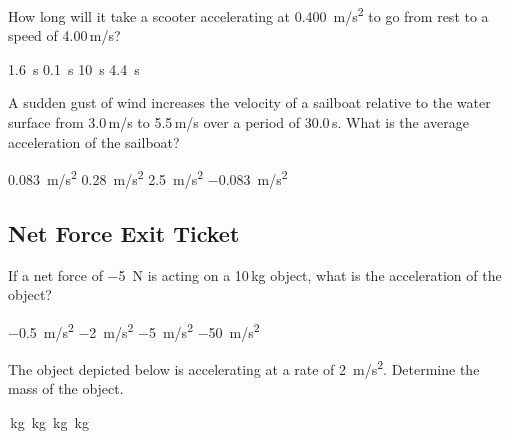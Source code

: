 \documentclass[../main-physics-problems.tex]{subfiles}
\begin{document}
\begin{questions}
\question
How long will it take a scooter accelerating at \SI{0.400}{m/s^2} to go from rest to a speed of 4.00\,m/s?

\begin{randomizechoices}
    \choice \SI{1.6}{s}
    \choice \SI{0.1}{s}
    \correctchoice \SI{10}{s}
    \choice \SI{4.4}{s}
\end{randomizechoices}

\question
A sudden gust of wind increases the velocity of a sailboat relative to the water surface from 3.0\,m/s to 5.5\,m/s over a period of 30.0\,s. What is the average acceleration of the sailboat?

\begin{randomizechoices}
    \correctchoice \SI{0.083}{m/s^2}
    \choice \SI{0.28}{m/s^2}
    \choice \SI{2.5}{m/s^2}
    \choice \SI{-0.083}{m/s^2}
\end{randomizechoices}

\begin{EnvUplevel}
    \subsection*{Net Force Exit Ticket}
\end{EnvUplevel}

\question
If a net force of \SI{-5}{N} is acting on a 10\,kg object, what is the acceleration of the object?

\begin{randomizechoices}
    \correctchoice \SI{-0.5}{m/s^2}
    \choice \SI{-2}{m/s^2}
    \choice \SI{-5}{m/s^2}
    \choice \SI{-50}{m/s^2}
\end{randomizechoices}

\question
The object depicted below is accelerating at a rate of \SI{2}{m/s^2}. Determine the mass of the object.

\begin{center}
\end{center}

\begin{randomizechoices}
    \,kg
    \,kg
    \,kg
    \,kg
\end{randomizechoices}


\end{questions}
\end{document}
